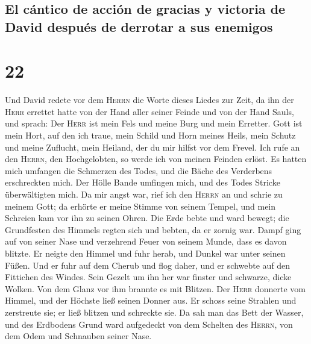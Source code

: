 \hypertarget{el-cuxe1ntico-de-acciuxf3n-de-gracias-y-victoria-de-david-despuuxe9s-de-derrotar-a-sus-enemigos}{%
\subsection{El cántico de acción de gracias y victoria de David después
de derrotar a sus
enemigos}\label{el-cuxe1ntico-de-acciuxf3n-de-gracias-y-victoria-de-david-despuuxe9s-de-derrotar-a-sus-enemigos}}

\hypertarget{section-21}{%
\section{22}\label{section-21}}

 Und David redete vor dem \textsc{Herrn} die Worte dieses
Liedes zur Zeit, da ihn der \textsc{Herr} errettet hatte von der Hand
aller seiner Feinde und von der Hand Sauls, und sprach: 
Der \textsc{Herr} ist mein Fels und meine Burg und mein Erretter.
 Gott ist mein Hort, auf den ich traue, mein Schild und
Horn meines Heils, mein Schutz und meine Zuflucht, mein Heiland, der du
mir hilfst vor dem Frevel.  Ich rufe an den
\textsc{Herrn}, den Hochgelobten, so werde ich von meinen Feinden
erlöst.  Es hatten mich umfangen die Schmerzen des Todes,
und die Bäche des Verderbens erschreckten mich.  Der Hölle
Bande umfingen mich, und des Todes Stricke überwältigten mich.
 Da mir angst war, rief ich den \textsc{Herrn} an und
schrie zu meinem Gott; da erhörte er meine Stimme von seinem Tempel, und
mein Schreien kam vor ihn zu seinen Ohren.  Die Erde bebte
und ward bewegt; die Grundfesten des Himmels regten sich und bebten, da
er zornig war.  Dampf ging auf von seiner Nase und
verzehrend Feuer von seinem Munde, dass es davon blitzte.
 Er neigte den Himmel und fuhr herab, und Dunkel war
unter seinen Füßen.  Und er fuhr auf dem Cherub und flog
daher, und er schwebte auf den Fittichen des Windes. 
Sein Gezelt um ihn her war finster und schwarze, dicke Wolken.
 Von dem Glanz vor ihm brannte es mit Blitzen.
 Der \textsc{Herr} donnerte vom Himmel, und der Höchste
ließ seinen Donner aus.  Er schoss seine Strahlen und
zerstreute sie; er ließ blitzen und schreckte sie.  Da
sah man das Bett der Wasser, und des Erdbodens Grund ward aufgedeckt von
dem Schelten des \textsc{Herrn}, von dem Odem und Schnauben seiner Nase.
